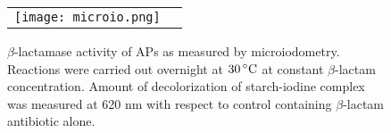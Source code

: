 
\begin{figure}[t]
\begin{center}
\begin{tabular}{cc}
    \texttt{[image: microio.png]}
\end{tabular}
\end{center}
\caption { 
$\beta$-lactamase activity of APs as measured by microiodometry. Reactions were carried out overnight at $30\,^{\circ}{\rm C}$ at constant $\beta$-lactam concentration. Amount of decolorization of starch-iodine complex was measured at 620 nm with respect to control containing $\beta$-lactam antibiotic alone.  
} \label{microiodometric}
\end{figure}
